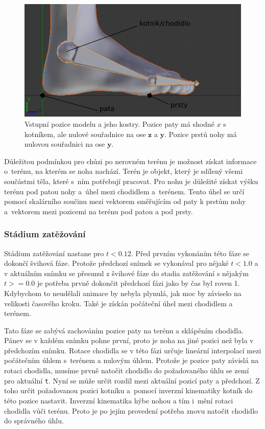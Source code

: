 \begin{figure}[h]
	\centering
	\includegraphics[width=0.7\linewidth]{fig/pozice_paty.pdf}
	\caption{Vstupní pozice modelu a jeho kostry. Pozice paty má shodné $x$ s kotníkem, ale nulové souřadnice na ose $\mathbf{z}$ a $\mathbf{y}$. Pozice prstů nohy má nulovou souřadnici na ose $\mathbf{y}$.}
	\label{fig:pozice_paty}
\end{figure}

Důležitou podmínkou pro chůzi po nerovném terénu je možnost získat informace o~terénu, na kterém se noha nachází. Terén je objekt, který je sdílený všemi součástmi těla, které s~ním potřebují pracovat. Pro nohu je důležité získat výšku terénu pod patou nohy a~úhel mezi chodidlem a~terénem. Tento úhel se určí pomocí skalárního součinu mezi vektorem směřujícím od paty k prstům nohy a~vektorem mezi pozicemi na terénu pod patou a pod prsty. 

\subsubsection{Stádium zatěžování}
Stádium zatěžování nastane pro $t < 0.12$. Před prvním vykonáním této fáze se dokončí švihová fáze. Protože předchozí snímek se vykonával pro nějaké $t < 1.0$ a v aktuálním snímku se přesunul z švihové fáze do stadia zatěžování s nějakým $t >= 0.0$ je potřeba prvně dokončit předchozí fázi jako by čas byl roven 1. Kdybychom to neudělali animace by nebyla plynulá, jak moc by záviselo na velikosti časového kroku. Také je získán počáteční úhel mezi chodidlem a terénem. 

Tato fáze se zabývá zachováním pozice paty na terénu a sklápěním chodidla. Pánev se v každém snímku pohne první, proto je noha na jiné pozici než byla v předchozím snímku. Rotace chodidla se v této fázi určuje lineární interpolací mezi počátečním úhlem s~terénem a nulovým úhlem. Protože je pozice paty závislá na rotaci chodidla, musíme prvně natočit chodidlo do požadovaného úhlu se zemí pro aktuální \texttt{t}. Nyní se může určit rozdíl mezi aktuální pozicí paty a předchozí. Z toho určit požadovanou pozici kotníku a~pomocí inverzní kinematiky kotník do této pozice nastavit. Inverzní kinematika hýbe nohou a tím i~mění rotaci chodidla vůči terénu. Proto je po jejím provedení potřeba znovu natočit chodidlo do správného úhlu.

